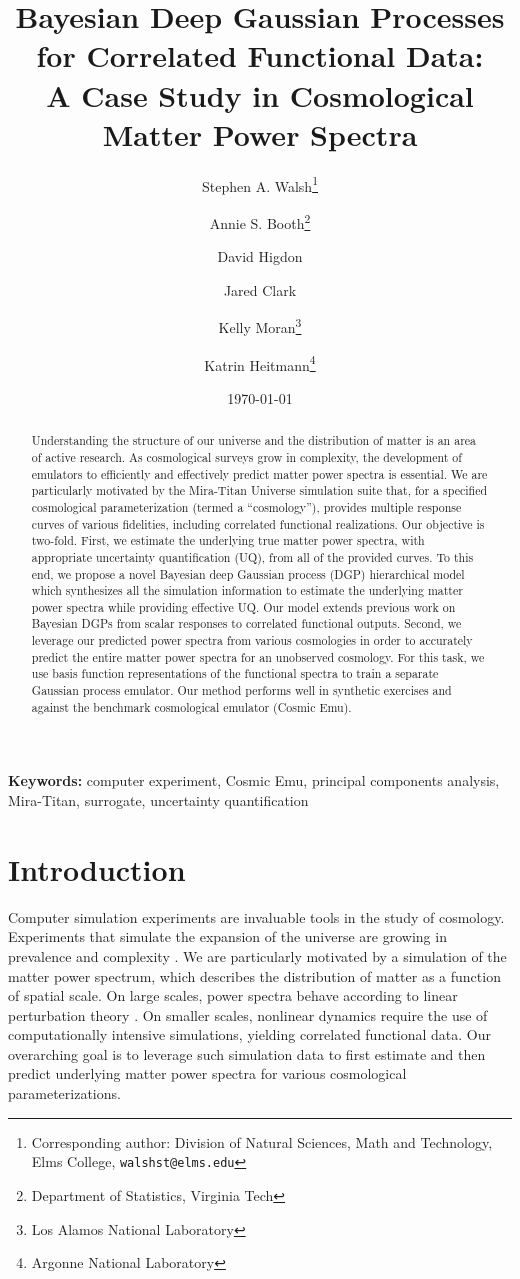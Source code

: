 \documentclass[11pt]{article}
\title{Bayesian Deep Gaussian Processes for Correlated Functional Data: \\
        A Case Study in Cosmological Matter Power Spectra}
\author{Stephen A. Walsh\thanks{Corresponding author: Division of Natural Sciences, 
        Math and Technology, Elms College, {\tt walshst@elms.edu}} \and 
        Annie S. Booth\thanks{Department of Statistics, Virginia Tech} \and
        David Higdon\footnotemark[2] \and
        Jared Clark\footnotemark[2] \and
        Kelly Moran\thanks{Los Alamos National Laboratory} \and
        Katrin Heitmann\thanks{Argonne National Laboratory}}
\date{\today}
\begin{document}
\maketitle
\bigskip

\begin{abstract} 
Understanding the structure of our universe and the distribution of matter is an 
area of active research.  As cosmological surveys grow in complexity, the development 
of emulators to efficiently and effectively predict matter power spectra is essential.  
We are particularly motivated by the Mira-Titan Universe simulation
suite that, for a specified cosmological parameterization (termed a ``cosmology''), 
provides multiple response curves of various fidelities, including correlated 
functional realizations.  Our objective is two-fold.  First, we estimate 
the underlying true matter power spectra, with appropriate uncertainty 
quantification (UQ), from all of the provided curves.  To this end, we propose a 
novel Bayesian deep Gaussian process (DGP) hierarchical model which synthesizes 
all the simulation information to estimate the underlying matter power spectra
while providing effective UQ.  Our model extends previous work on Bayesian DGPs 
from scalar responses to correlated functional outputs.  Second, we leverage our predicted 
power spectra from various cosmologies in order to accurately predict the entire 
matter power spectra for an 
unobserved cosmology.  For this task, we use basis function representations 
of the functional spectra to train a separate Gaussian process emulator.  
Our method performs well in synthetic exercises and against the benchmark cosmological 
emulator (Cosmic Emu).
\end{abstract}

\noindent \textbf{Keywords:} computer experiment, Cosmic Emu, 
principal components analysis, Mira-Titan, surrogate, uncertainty quantification


\section{Introduction}

Computer simulation experiments are invaluable tools in the study of cosmology.
Experiments that simulate the expansion of the universe are growing
in prevalence and complexity \citep[e.g.,][]{lawrence2010coyote,derose2019aemulus,
nishimichi2019dark,angulo2021bacco,euclid2021euclid,moran2023mira}.  
We are particularly motivated by a simulation
of the matter power spectrum, which describes the distribution of matter as a 
function of spatial scale. 
On large scales, power spectra behave according to linear perturbation 
theory \citep{pietroni2008flowing, lesgourgues2009non}.  On smaller scales, nonlinear 
dynamics require the use of computationally intensive simulations, yielding
correlated functional data. Our overarching goal is to leverage such simulation data to 
first estimate and then predict underlying matter power spectra for various 
cosmological parameterizations.
\end{document}

